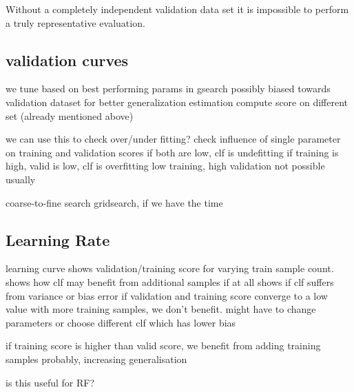 Without a completely independent validation data set it is impossible to perform
a truly representative evaluation.


\subsection{validation curves}
we tune based on best performing params in gsearch
possibly biased towards validation dataset
for better generalization estimation compute score on different set
(already mentioned above)

we can use this to check over/under fitting?
check influence of single parameter on training and validation scores
if both are low, clf is undefitting
if training is high, valid is low, clf is overfitting
low training, high validation not possible usually

coarse-to-fine search gridsearch, if we have the time

\subsection{Learning Rate}
learning curve
shows validation/training score for varying train sample count.
shows how clf may benefit from additional samples if at all
shows if clf suffers from variance or bias error
if validation and training score converge to a low value with more training samples,
we don't benefit. might have to change parameters or choose different clf which
has lower bias

if training score is higher than valid score, we benefit from adding training
samples probably, increasing generalisation

is this useful for RF?
